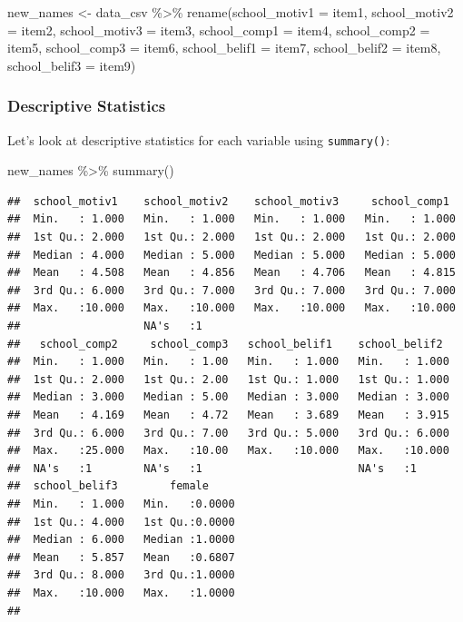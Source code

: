 \documentclass[
]{article}
\newenvironment{Shaded}{\begin{snugshade}}{\end{snugshade}}
\newcommand{\AttributeTok}[1]{\textcolor[rgb]{0.77,0.63,0.00}{#1}}
\newcommand{\FunctionTok}[1]{\textcolor[rgb]{0.00,0.00,0.00}{#1}}
\newcommand{\NormalTok}[1]{#1}
\newcommand{\OtherTok}[1]{\textcolor[rgb]{0.56,0.35,0.01}{#1}}
\newcommand{\SpecialCharTok}[1]{\textcolor[rgb]{0.00,0.00,0.00}{#1}}
\begin{document}
\begin{Shaded}
\begin{Highlighting}[]
\NormalTok{new\_names }\OtherTok{\textless{}{-}}\NormalTok{ data\_csv }\SpecialCharTok{\%\textgreater{}\%}
  \FunctionTok{rename}\NormalTok{(}\AttributeTok{school\_motiv1 =}\NormalTok{ item1,}
         \AttributeTok{school\_motiv2 =}\NormalTok{ item2,}
         \AttributeTok{school\_motiv3 =}\NormalTok{ item3,}
         \AttributeTok{school\_comp1 =}\NormalTok{ item4,}
         \AttributeTok{school\_comp2 =}\NormalTok{ item5,}
         \AttributeTok{school\_comp3 =}\NormalTok{ item6,}
         \AttributeTok{school\_belif1 =}\NormalTok{ item7,}
         \AttributeTok{school\_belif2 =}\NormalTok{ item8,}
         \AttributeTok{school\_belif3 =}\NormalTok{ item9)}
\end{Highlighting}
\end{Shaded}

\hypertarget{descriptive-statistics}{%
\subsubsection{Descriptive Statistics}\label{descriptive-statistics}}

Let's look at descriptive statistics for each variable using
\texttt{summary()}:

\begin{Shaded}
\begin{Highlighting}[]
\NormalTok{new\_names }\SpecialCharTok{\%\textgreater{}\%} 
  \FunctionTok{summary}\NormalTok{() }
\end{Highlighting}
\end{Shaded}

\begin{verbatim}
##  school_motiv1    school_motiv2    school_motiv3     school_comp1   
##  Min.   : 1.000   Min.   : 1.000   Min.   : 1.000   Min.   : 1.000  
##  1st Qu.: 2.000   1st Qu.: 2.000   1st Qu.: 2.000   1st Qu.: 2.000  
##  Median : 4.000   Median : 5.000   Median : 5.000   Median : 5.000  
##  Mean   : 4.508   Mean   : 4.856   Mean   : 4.706   Mean   : 4.815  
##  3rd Qu.: 6.000   3rd Qu.: 7.000   3rd Qu.: 7.000   3rd Qu.: 7.000  
##  Max.   :10.000   Max.   :10.000   Max.   :10.000   Max.   :10.000  
##                   NA's   :1                                         
##   school_comp2     school_comp3   school_belif1    school_belif2   
##  Min.   : 1.000   Min.   : 1.00   Min.   : 1.000   Min.   : 1.000  
##  1st Qu.: 2.000   1st Qu.: 2.00   1st Qu.: 1.000   1st Qu.: 1.000  
##  Median : 3.000   Median : 5.00   Median : 3.000   Median : 3.000  
##  Mean   : 4.169   Mean   : 4.72   Mean   : 3.689   Mean   : 3.915  
##  3rd Qu.: 6.000   3rd Qu.: 7.00   3rd Qu.: 5.000   3rd Qu.: 6.000  
##  Max.   :25.000   Max.   :10.00   Max.   :10.000   Max.   :10.000  
##  NA's   :1        NA's   :1                        NA's   :1       
##  school_belif3        female      
##  Min.   : 1.000   Min.   :0.0000  
##  1st Qu.: 4.000   1st Qu.:0.0000  
##  Median : 6.000   Median :1.0000  
##  Mean   : 5.857   Mean   :0.6807  
##  3rd Qu.: 8.000   3rd Qu.:1.0000  
##  Max.   :10.000   Max.   :1.0000  
## 
\end{verbatim}
\end{document}
